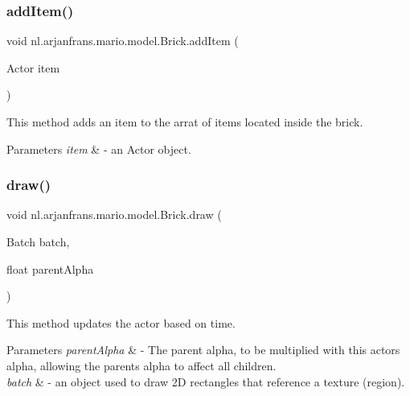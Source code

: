 \subsubsection{\texorpdfstring{add\+Item()}{addItem()}}
{\footnotesize\ttfamily void nl.\+arjanfrans.\+mario.\+model.\+Brick.\+add\+Item (\begin{DoxyParamCaption}\item[{Actor}]{item }\end{DoxyParamCaption})}



This method adds an item to the arrat of items located inside the brick. 


\begin{DoxyParams}{Parameters}
{\em item} & -\/ an Actor object. \\
\hline
\end{DoxyParams}
\mbox{\label{classnl_1_1arjanfrans_1_1mario_1_1model_1_1Brick_a92e1021bfa260049d650dc962874b19a}} 
\subsubsection{\texorpdfstring{draw()}{draw()}}
{\footnotesize\ttfamily void nl.\+arjanfrans.\+mario.\+model.\+Brick.\+draw (\begin{DoxyParamCaption}\item[{Batch}]{batch,  }\item[{float}]{parent\+Alpha }\end{DoxyParamCaption})}



This method updates the actor based on time. 


\begin{DoxyParams}{Parameters}
{\em parent\+Alpha} & -\/ The parent alpha, to be multiplied with this actor\textquotesingle{}s alpha, allowing the parent\textquotesingle{}s alpha to affect all children. \\
\hline
{\em batch} & -\/ an object used to draw 2D rectangles that reference a texture (region). \\
\hline
\end{DoxyParams}
\mbox{\label{classnl_1_1arjanfrans_1_1mario_1_1model_1_1Brick_ab7c75746c482b7e43dc22937cf100624}} 
